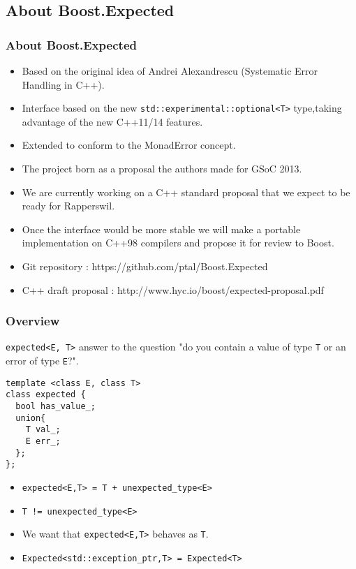 \documentclass[xcolor=dvipsnames]{beamer}
\newcommand{\cpp}[1]{\lstinline{#1}}
\begin{document}
\subsection{About Boost.Expected}
\begin{frame}
\frametitle{About Boost.Expected}

\begin{itemize}
\item Based on the original idea of Andrei Alexandrescu (Systematic Error Handling in C++).
\item Interface based on the new \cpp{std::experimental::optional<T>} type,taking advantage of the new C++11/14 features.
\item Extended to conform to the MonadError concept.
\item The project born as a proposal the authors made for GSoC 2013.
\item We are currently working on a C++ standard proposal that we expect to be ready for Rapperswil.
\item Once the interface would be more stable we will make a portable implementation on C++98 compilers and propose it for review to Boost.
\end{itemize}

\begin{itemize}
\item Git repository : https://github.com/ptal/Boost.Expected
\item C++ draft proposal : http://www.hyc.io/boost/expected-proposal.pdf
\end{itemize}
\end{frame}
\begin{frame}[fragile]
\frametitle{Overview}

\cpp{expected<E, T>} answer to the question "do you contain a value of type \cpp{T} or an error of type \cpp{E}?".

\begin{lstlisting}
template <class E, class T>
class expected {
  bool has_value_;
  union{ 
    T val_;
    E err_;
  };
};
\end{lstlisting}

\begin{itemize}
\item \cpp{expected<E,T> = T + unexpected_type<E>}
\item \cpp{T != unexpected_type<E>}
\item We want that \cpp{expected<E,T>} behaves as \cpp{T}.
\item \cpp{Expected<std::exception_ptr,T> = Expected<T>}
\end{itemize}


\end{frame}
\end{document}

